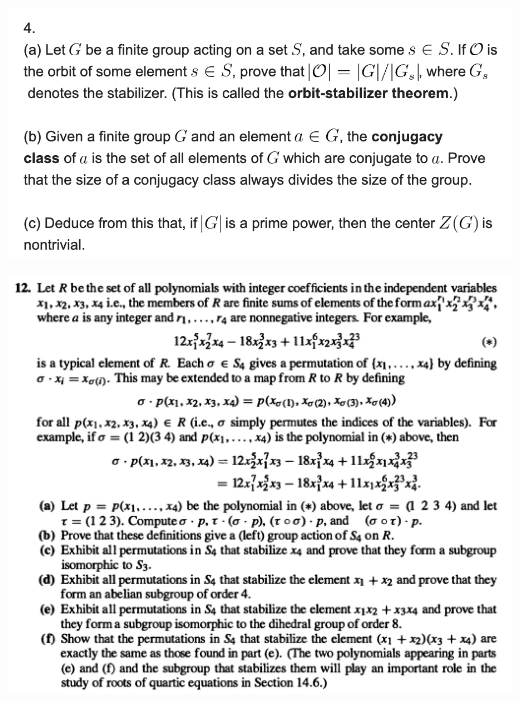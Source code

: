 \begin{mdframed}
\includegraphics[width=400pt]{img/abstract-algebra--nf--5-23d3.png}
\end{mdframed}




\begin{mdframed}
\includegraphics[width=400pt]{img/abstract-algebra--nf--5-4abb.png}
\end{mdframed}
